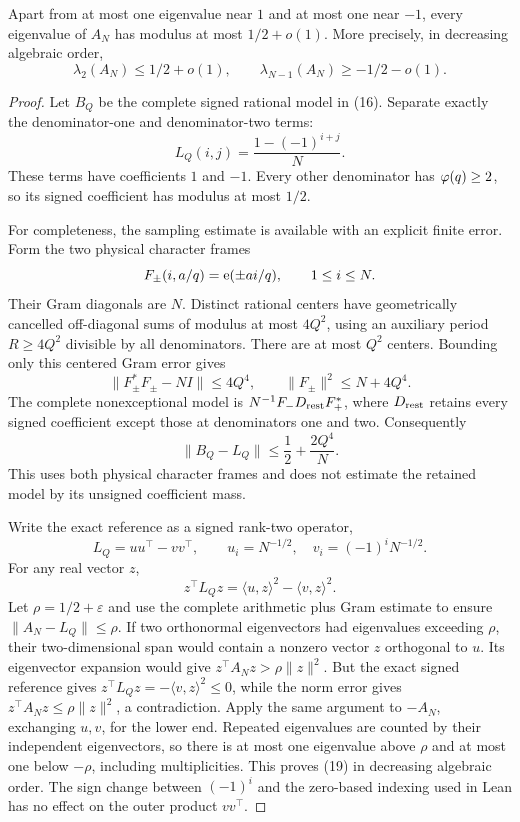 \begin{lemma}
\label{lem:integerspectrum}
Apart from at most one eigenvalue near \(1\) and at most one
near \(-1\), every eigenvalue of \(A_N\) has modulus at most
\(1/2+o(1)\). More precisely, in decreasing algebraic order,
\[
 \lambda_2(A_N)\leq1/2+o(1),\qquad
 \lambda_{N-1}(A_N)\geq-1/2-o(1).
 \tag{19}
\]
\end{lemma}
\begin{proof}
Let \(B_Q\) be the complete signed rational model in (16).
Separate exactly the denominator-one and denominator-two terms:
\[
 L_Q(i,j)=\frac{1-(-1)^{i+j}}{N}.
\]
These terms have coefficients \(1\) and \(-1\).
Every other denominator has \(\varphi(q)\geq2\), so its signed
coefficient has modulus at most \(1/2\).

For completeness, the sampling estimate is available with an
explicit finite error. Form the two physical character frames
\[
 F_\pm(i,a/q)=\mathrm e(\pm ai/q),\qquad 1\leq i\leq N.
\]
Their Gram diagonals are \(N\). Distinct rational centers
have geometrically cancelled off-diagonal sums of modulus at
most \(4Q^2\), using an auxiliary period \(R\geq4Q^2\)
divisible by all denominators. There are at most \(Q^2\)
centers. Bounding only this centered Gram error gives
\[
 \|F_\pm^*F_\pm-NI\|\leq4Q^4,\qquad
 \|F_\pm\|^2\leq N+4Q^4.
\]
The complete nonexceptional model is
\(N^{-1}F_-D_{\rm rest}F_+^*\), where \(D_{\rm rest}\)
retains every signed coefficient except those at denominators
one and two. Consequently
\[
 \|B_Q-L_Q\|\leq\frac12+\frac{2Q^4}{N}.
\]
This uses both physical character frames and does not estimate
the retained model by its unsigned coefficient mass.

Write the exact reference as a signed rank-two operator,
\[
 L_Q=uu^\top-vv^\top,\qquad
 u_i=N^{-1/2},\quad v_i=(-1)^iN^{-1/2}.
\]
For any real vector \(z\),
\[
 z^\top L_Qz=\langle u,z\rangle^2-\langle v,z\rangle^2.
\]
Let \(\rho=1/2+\varepsilon\) and use the complete arithmetic
plus Gram estimate to ensure \(\|A_N-L_Q\|\leq\rho\).
If two orthonormal eigenvectors had eigenvalues exceeding \(\rho\),
their two-dimensional span would contain a nonzero vector \(z\)
orthogonal to \(u\).
Its eigenvector expansion would give
\(z^\top A_Nz>\rho\|z\|^2\).
But the exact signed reference gives
\(z^\top L_Qz=-\langle v,z\rangle^2\leq0\), while the norm
error gives \(z^\top A_Nz\leq\rho\|z\|^2\), a contradiction.
Apply the same argument to \(-A_N\), exchanging \(u,v\), for
the lower end.
Repeated eigenvalues are counted by their independent eigenvectors,
so there is at most one eigenvalue above \(\rho\) and at most one
below \(-\rho\), including multiplicities.
This proves (19) in decreasing algebraic order.
The sign change between \((-1)^i\) and the zero-based indexing used
in Lean has no effect on the outer product \(vv^\top\).
\end{proof}

